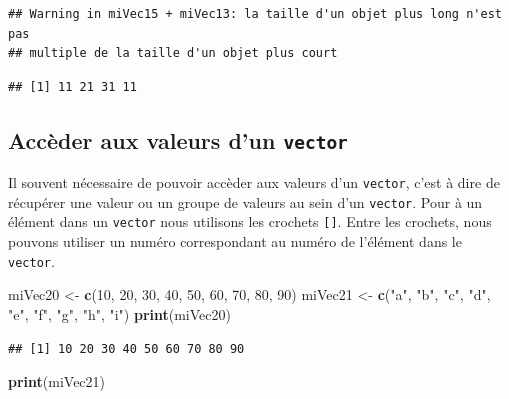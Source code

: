 \documentclass[]{book}
\newenvironment{Shaded}{\begin{snugshade}}{\end{snugshade}}
\newcommand{\DecValTok}[1]{\textcolor[rgb]{0.00,0.00,0.81}{#1}}
\newcommand{\KeywordTok}[1]{\textcolor[rgb]{0.13,0.29,0.53}{\textbf{#1}}}
\newcommand{\NormalTok}[1]{#1}
\newcommand{\StringTok}[1]{\textcolor[rgb]{0.31,0.60,0.02}{#1}}
\begin{document}
\begin{verbatim}
## Warning in miVec15 + miVec13: la taille d'un objet plus long n'est pas
## multiple de la taille d'un objet plus court
\end{verbatim}

\begin{verbatim}
## [1] 11 21 31 11
\end{verbatim}

\hypertarget{acceder-aux-valeurs-dun-vector}{%
\subsection{\texorpdfstring{Accèder aux valeurs d'un \texttt{vector}}{Accèder aux valeurs d'un vector}}\label{acceder-aux-valeurs-dun-vector}}

Il souvent nécessaire de pouvoir accèder aux valeurs d'un \texttt{vector}, c'est à dire de récupérer une valeur ou un groupe de valeurs au sein d'un \texttt{vector}. Pour à un élément dans un \texttt{vector} nous utilisons les crochets \texttt{{[}{]}}. Entre les crochets, nous pouvons utiliser un numéro correspondant au numéro de l'élément dans le \texttt{vector}.

\begin{Shaded}
\begin{Highlighting}[]
\NormalTok{miVec20 <-}\StringTok{ }\KeywordTok{c}\NormalTok{(}\DecValTok{10}\NormalTok{, }\DecValTok{20}\NormalTok{, }\DecValTok{30}\NormalTok{, }\DecValTok{40}\NormalTok{, }\DecValTok{50}\NormalTok{, }\DecValTok{60}\NormalTok{, }\DecValTok{70}\NormalTok{, }\DecValTok{80}\NormalTok{, }\DecValTok{90}\NormalTok{)}
\NormalTok{miVec21 <-}\StringTok{ }\KeywordTok{c}\NormalTok{(}\StringTok{"a"}\NormalTok{, }\StringTok{"b"}\NormalTok{, }\StringTok{"c"}\NormalTok{, }\StringTok{"d"}\NormalTok{, }\StringTok{"e"}\NormalTok{, }\StringTok{"f"}\NormalTok{, }\StringTok{"g"}\NormalTok{, }\StringTok{"h"}\NormalTok{, }\StringTok{"i"}\NormalTok{)}
\KeywordTok{print}\NormalTok{(miVec20)}
\end{Highlighting}
\end{Shaded}

\begin{verbatim}
## [1] 10 20 30 40 50 60 70 80 90
\end{verbatim}

\begin{Shaded}
\begin{Highlighting}[]
\KeywordTok{print}\NormalTok{(miVec21)}
\end{Highlighting}
\end{Shaded}
\end{document}
